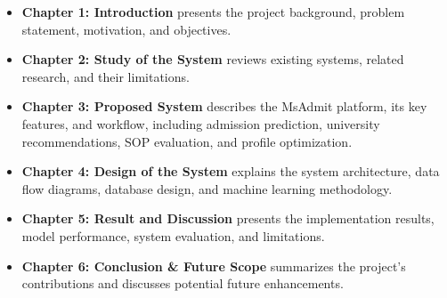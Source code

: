 \begin{itemize}
    \item \textbf{Chapter 1: Introduction} presents the project background, problem statement, motivation, and objectives.

    \item \textbf{Chapter 2: Study of the System} reviews existing systems, related research, and their limitations.

    \item \textbf{Chapter 3: Proposed System} describes the MsAdmit platform, its key features, and workflow, including admission prediction, university recommendations, SOP evaluation, and profile optimization.

    \item \textbf{Chapter 4: Design of the System} explains the system architecture, data flow diagrams, database design, and machine learning methodology.

    \item \textbf{Chapter 5: Result and Discussion} presents the implementation results, model performance, system evaluation, and limitations.

    \item \textbf{Chapter 6: Conclusion \& Future Scope} summarizes the project's contributions and discusses potential future enhancements.
\end{itemize}



